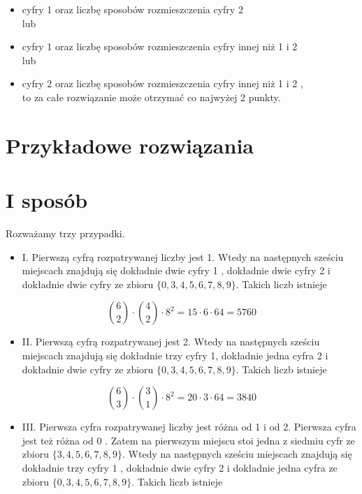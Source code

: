 \documentclass[10pt]{article}
\begin{document}
\begin{itemize}
  \item cyfry 1 oraz liczbę sposobów rozmieszczenia cyfry 2\\
lub
  \item cyfry 1 oraz liczbę sposobów rozmieszczenia cyfry innej niż 1 i 2\\
lub
  \item cyfry 2 oraz liczbę sposobów rozmieszczenia cyfry innej niż 1 i 2 ,\\
to za całe rozwiązanie może otrzymać co najwyżej 2 punkty.
\end{itemize}

\section*{Przykładowe rozwiązania}
\section*{I sposób}
Rozważamy trzy przypadki.

\begin{itemize}
  \item I. Pierwszą cyfrą rozpatrywanej liczby jest 1. Wtedy na następnych sześciu miejscach znajdują się dokładnie dwie cyfry 1 , dokładnie dwie cyfry 2 i dokładnie dwie cyfry ze zbioru $\{0,3,4,5,6,7,8,9\}$. Takich liczb istnieje
\end{itemize}

$$
\binom{6}{2} \cdot\binom{4}{2} \cdot 8^{2}=15 \cdot 6 \cdot 64=5760
$$

\begin{itemize}
  \item II. Pierwszą cyfrą rozpatrywanej jest 2. Wtedy na następnych sześciu miejscach znajdują się dokładnie trzy cyfry 1, dokładnie jedna cyfra 2 i dokładnie dwie cyfry ze zbioru $\{0,3,4,5,6,7,8,9\}$. Takich liczb istnieje
\end{itemize}

$$
\binom{6}{3} \cdot\binom{3}{1} \cdot 8^{2}=20 \cdot 3 \cdot 64=3840
$$

\begin{itemize}
  \item III. Pierwsza cyfra rozpatrywanej liczby jest różna od 1 i od 2. Pierwsza cyfra jest też różna od 0 . Zatem na pierwszym miejscu stoi jedna z siedmiu cyfr ze zbioru $\{3,4,5,6,7,8,9\}$. Wtedy na następnych sześciu miejscach znajdują się dokładnie trzy cyfry 1 , dokładnie dwie cyfry 2 i dokładnie jedna cyfra ze zbioru $\{0,3,4,5,6,7,8,9\}$. Takich liczb istnieje
\end{itemize}
\end{document}
